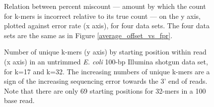 \documentclass{article}
\begin{document}
\begin{figure}
\caption{Relation between percent miscount --- amount by which
the count for k-mers is incorrect relative to its true count --- on the y axis, plotted against
error rate (x axis), for four data sets.  The four data
sets are the same as in Figure \ref{average_offset_vs_fpr}.}
\label{percent_offset_vs_fpr}
\end{figure}

\begin{figure}
\caption{Number of unique k-mers (y axis) by starting position within read (x axis) in an untrimmed {\em E. coli} 100-bp Illumina shotgun data set, for k=17 and k=32.  The increasing numbers of unique k-mers are a sign of the increasing sequencing error towards the 3' end of reads.  Note that there are only 69 starting positions for 32-mers in a 100 base read.}
\label{perc_unique_pos}
\end{figure}
\end{document}
